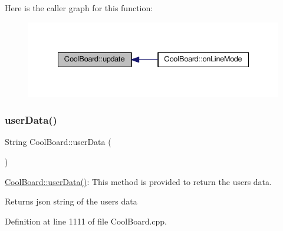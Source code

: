 Here is the caller graph for this function\+:\nopagebreak
\begin{figure}[H]
\begin{center}
\leavevmode
\includegraphics[width=335pt]{d7/df9/class_cool_board_a8612756d3f73198cdde857a66f0fe690_icgraph}
\end{center}
\end{figure}
\mbox{\label{class_cool_board_ae7358fb6e623cfc81b775f5f1734909b}} 
\subsubsection{\texorpdfstring{user\+Data()}{userData()}}
{\footnotesize\ttfamily String Cool\+Board\+::user\+Data (\begin{DoxyParamCaption}{ }\end{DoxyParamCaption})}

\hyperlink{class_cool_board_ae7358fb6e623cfc81b775f5f1734909b}{Cool\+Board\+::user\+Data()}\+: This method is provided to return the user\textquotesingle{}s data.

\begin{DoxyReturn}{Returns}
json string of the user\textquotesingle{}s data 
\end{DoxyReturn}


Definition at line 1111 of file Cool\+Board.\+cpp.


